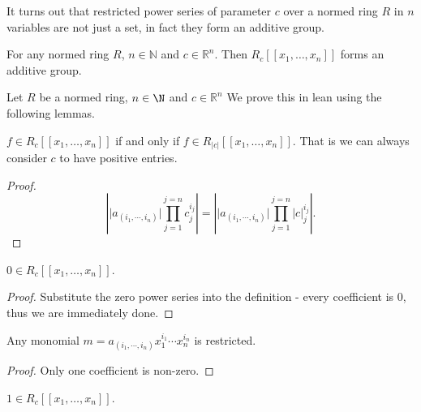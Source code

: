 It turns out that restricted power series of parameter $c$ over a normed ring $R$ in $n$ variables
are not just a set, in fact they form an additive group.

\begin{theorem}
  For any normed ring $R$, $n \in \mathbb{N}$ and $c \in \mathbb{R}^n$. Then
  $R_c [ \! [ x_1, \dots, x_n ] \! ]$ forms an additive group.
\end{theorem}

Let $R$ be a normed ring, $n \in \N$ and $c \in \mathbb{R}^n$
We prove this in lean using the following lemmas.

\begin{lemma}
  \label{isRestricted_iff_abs}
  \leanok
  $f \in R_c [ \! [ x_1, \dots, x_n ] \! ]$ if and only if $f \in R_{\lvert c \rvert}
  [ \! [ x_1, \dots, x_n ] \! ]$.
  That is we can always consider $c$ to have positive entries.
\end{lemma}

\begin{proof}
  \[
    \left \lvert \lvert a_{(i_1, \cdots, i_n)} \rvert \prod_{j=1}^{j=n} c_j^{i_j} \right \rvert =
    \left \lvert \lvert a_{(i_1, \cdots, i_n)} \rvert \prod_{j=1}^{j=n} \lvert c \rvert _j^{i_j}
    \right \rvert.
  \]
\end{proof}

\begin{lemma}
  \label{zero}
  \leanok
  $0 \in R_c [ \! [ x_1, \dots, x_n ] \! ]$.
\end{lemma}

\begin{proof}
  Substitute the zero power series into the definition - every coefficient is 0, thus we are
  immediately done.
\end{proof}

\begin{lemma}
  \label{monomial}
  \leanok
  Any monomial $m = a_{(i_1, \cdots, i_n)} x_1^{i_1} \cdots x_n^{i_n}$ is restricted.
\end{lemma}

\begin{proof}
  Only one coefficient is non-zero.
\end{proof}

\begin{lemma}
  \label{One}
  \leanok
  $1 \in R_c [ \! [ x_1, \dots, x_n ] \! ]$.
\end{lemma}

